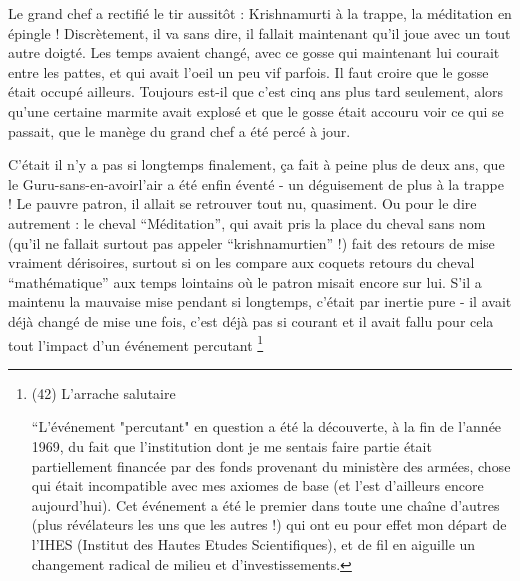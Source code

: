 Le grand chef a rectifié le tir aussitôt : Krishnamurti à la trappe, la méditation en épingle ! Discrètement, il va sans dire, il fallait maintenant qu'il joue avec un tout autre doigté. Les temps avaient changé, avec ce gosse qui maintenant lui courait entre les pattes, et qui avait l'oeil un peu vif parfois. Il faut croire que le gosse était occupé ailleurs. Toujours est-il que c'est cinq ans plus tard seulement, alors qu'une certaine marmite avait explosé et que le gosse était accouru voir ce qui se passait, que le manège du grand chef a été percé à jour.

C'était il n'y a pas si longtemps finalement, ça fait à peine plus de deux ans, que le Guru-sans-en-avoirl'air a été enfin éventé - un déguisement de plus à la trappe ! Le pauvre patron, il allait se retrouver tout nu, quasiment. Ou pour le dire autrement : le cheval ``Méditation'', qui avait pris la place du cheval sans nom (qu'il ne fallait surtout pas appeler ``krishnamurtien'' !) fait des retours de mise vraiment dérisoires, surtout si on les compare aux coquets retours du cheval ``mathématique'' aux temps lointains où le patron misait encore sur lui. S'il a maintenu la mauvaise mise pendant si longtemps, c'était par inertie pure - il avait déjà changé de mise une fois, c'est déjà pas si courant et il avait fallu pour cela tout l'impact d'un événement percutant \footnote{(42) L'arrache salutaire

``L'événement "percutant" en question a été la découverte, à la fin de l'année 1969, du fait que l'institution dont je me sentais faire partie était partiellement financée par des fonds provenant du ministère des armées, chose qui était incompatible avec mes axiomes de base (et l'est d'ailleurs encore aujourd'hui). Cet événement a été le premier dans toute une chaîne d'autres (plus révélateurs les uns que les autres !) qui ont eu pour effet mon départ de l'IHES (Institut des Hautes Etudes Scientifiques), et de fil en aiguille un changement radical de milieu et d'investissements.

}
